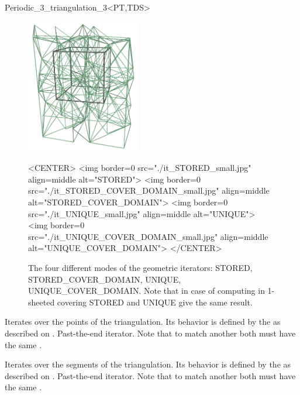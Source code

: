 \begin{ccRefClass}{Periodic_3_triangulation_3<PT,TDS>}
\begin{figure}[htbp]
\begin{ccTexOnly}
\begin{center}
\includegraphics[width=5cm]{Periodic_3_triangulation_3_ref/it_UNIQUE_COVER_DOMAIN} 
\end{center}
\end{ccTexOnly}
\begin{ccHtmlOnly}
<CENTER>
<img border=0 src="./it_STORED_small.jpg" align=middle
  alt="STORED">
<img border=0 src="./it_STORED_COVER_DOMAIN_small.jpg" align=middle
  alt="STORED_COVER_DOMAIN">
<img border=0 src="./it_UNIQUE_small.jpg" align=middle
  alt="UNIQUE">
<img border=0 src="./it_UNIQUE_COVER_DOMAIN_small.jpg" align=middle
  alt="UNIQUE_COVER_DOMAIN">
</CENTER>
\end{ccHtmlOnly}
\caption{The four different modes of the geometric iterators: STORED,
  STORED\_COVER\_DOMAIN, UNIQUE, UNIQUE\_COVER\_DOMAIN. Note that in
  case of computing in 1-sheeted covering STORED and UNIQUE give the
  same result.
\label{P3Triangulation3-fig-geom_iterators}}
\end{figure} 



{Iterates over the points of the triangulation. Its behavior is
  defined by the   as described on
  .}
\ccGlue
{}
{Past-the-end iterator. Note that to match another
   both must have the same
   .}

{Iterates over the segments of the triangulation. Its behavior is
  defined by the   as described on
  .}
\ccGlue
{}
{Past-the-end iterator. Note that to match another
   both must have the same
   .}


\end{ccRefClass}
